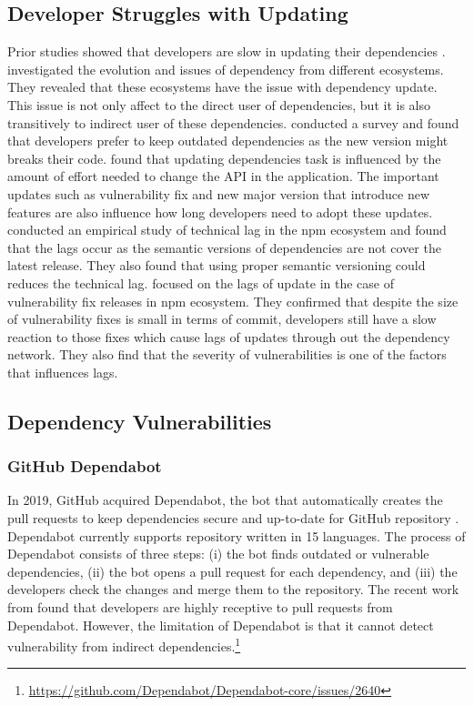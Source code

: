 \documentclass[conference]{IEEEtran}
\begin{document}
	\subsection{Developer Struggles with Updating}
        Prior studies showed that developers are slow in updating their dependencies \citep{Robbes:2012, Hora:2015, Sawant2016, Bavota:2015, Ihara:2017}.
        \citet{Decan:2017} investigated the evolution and issues of dependency from different ecosystems.
        They revealed that these ecosystems have the issue with dependency update.
        This issue is not only affect to the direct user of dependencies, but it is also transitively to indirect user of these dependencies.
        \citet{Bogart:2015} conducted a survey and found that developers prefer to keep outdated dependencies as the new version might breaks their code.
        \citet{Kula:2017} found that updating dependencies task is influenced by the amount of effort needed to change the API in the application.
        The important updates such as vulnerability fix and new major version that introduce new features are also influence how long developers need to adopt these updates.
        \citet{Decan:ICSME:2018} conducted an empirical study of technical lag in the npm ecosystem and found that the lags occur as the semantic versions of dependencies are not cover the latest release.
        They also found that using proper semantic versioning could reduces the technical lag.
        \citet{Chinthanet2021} focused on the lags of update in the case of vulnerability fix releases in npm ecosystem.
        They confirmed that despite the size of vulnerability fixes is small in terms of commit, developers still have a slow reaction to those fixes which cause lags of updates through out the dependency network.
        They also find that the severity of vulnerabilities is one of the factors that influences lags.
        
	
	\subsection{Dependency Vulnerabilities}
	\subsubsection{GitHub Dependabot}
	    In 2019, GitHub acquired Dependabot, the bot that automatically creates the pull requests to keep dependencies secure and up-to-date for GitHub repository \citep{Web:Dependabot}.
	    Dependabot currently supports repository written in 15 languages.
	    The process of Dependabot consists of three steps: (i) the bot finds outdated or vulnerable dependencies, (ii) the bot opens a pull request for each dependency, and (iii) the developers check the changes and merge them to the repository.
	    The recent work from \citet{Alfadel:MSR2021} found that developers are highly receptive to pull requests from Dependabot.
	    However, the limitation of Dependabot is that it cannot detect vulnerability from indirect dependencies.\footnote{\url{https://github.com/Dependabot/Dependabot-core/issues/2640}}
\end{document}
